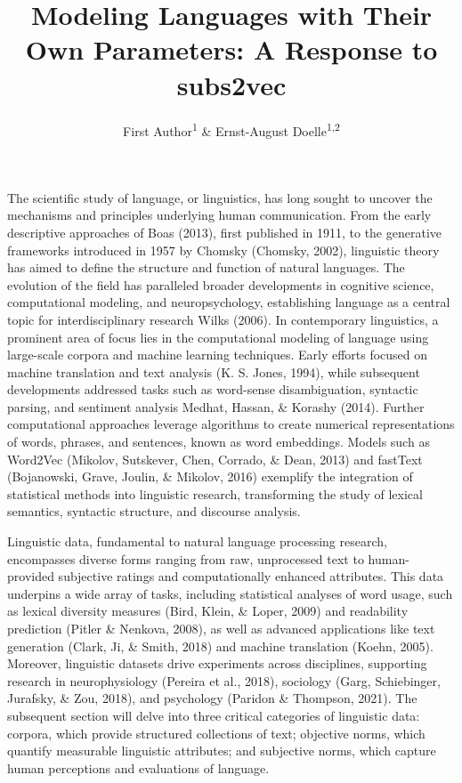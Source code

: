 \documentclass[
  man]{apa6}
\title{Modeling Languages with Their Own Parameters: A Response to subs2vec}
\author{First Author\textsuperscript{1} \& Ernst-August Doelle\textsuperscript{1,2}}
\date{}
\affiliation{\vspace{0.5cm}\textsuperscript{1} Wilhelm-Wundt-University\\\textsuperscript{2} Konstanz Business School}
\begin{document}
\maketitle

The scientific study of language, or linguistics, has long sought to uncover the mechanisms and principles underlying human communication. From the early descriptive approaches of Boas (2013), first published in 1911, to the generative frameworks introduced in 1957 by Chomsky (Chomsky, 2002), linguistic theory has aimed to define the structure and function of natural languages. The evolution of the field has paralleled broader developments in cognitive science, computational modeling, and neuropsychology, establishing language as a central topic for interdisciplinary research Wilks (2006). In contemporary linguistics, a prominent area of focus lies in the computational modeling of language using large-scale corpora and machine learning techniques. Early efforts focused on machine translation and text analysis (K. S. Jones, 1994), while subsequent developments addressed tasks such as word-sense disambiguation, syntactic parsing, and sentiment analysis Medhat, Hassan, \& Korashy (2014). Further computational approaches leverage algorithms to create numerical representations of words, phrases, and sentences, known as word embeddings. Models such as Word2Vec (Mikolov, Sutskever, Chen, Corrado, \& Dean, 2013) and fastText (Bojanowski, Grave, Joulin, \& Mikolov, 2016) exemplify the integration of statistical methods into linguistic research, transforming the study of lexical semantics, syntactic structure, and discourse analysis.

Linguistic data, fundamental to natural language processing research, encompasses diverse forms ranging from raw, unprocessed text to human-provided subjective ratings and computationally enhanced attributes. This data underpins a wide array of tasks, including statistical analyses of word usage, such as lexical diversity measures (Bird, Klein, \& Loper, 2009) and readability prediction (Pitler \& Nenkova, 2008), as well as advanced applications like text generation (Clark, Ji, \& Smith, 2018) and machine translation (Koehn, 2005). Moreover, linguistic datasets drive experiments across disciplines, supporting research in neurophysiology (Pereira et al., 2018), sociology (Garg, Schiebinger, Jurafsky, \& Zou, 2018), and psychology (Paridon \& Thompson, 2021). The subsequent section will delve into three critical categories of linguistic data: corpora, which provide structured collections of text; objective norms, which quantify measurable linguistic attributes; and subjective norms, which capture human perceptions and evaluations of language.
\end{document}
